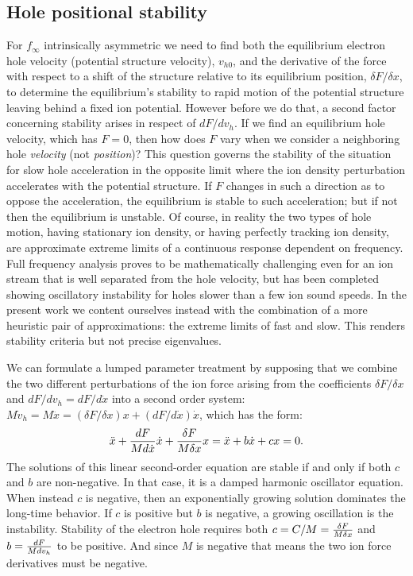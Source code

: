 \documentclass[12pt]{article}
\begin{document}
\subsection{Hole positional stability}
\label{3.2}

For $f_\infty$ intrinsically asymmetric we need to find both the
equilibrium electron hole velocity (potential structure velocity),
$v_{h0}$, and the derivative of the force with respect to a shift of
the structure relative to its equilibrium position,
$\delta F/\delta x$, to determine the equilibrium's stability to rapid
motion of the potential structure leaving behind a fixed ion
potential. However before we do that, a second factor concerning
stability arises in respect of $dF/dv_h$. If we find an equilibrium
hole velocity, which has $F=0$, then how does $F$ vary when we
consider a neighboring hole \emph{velocity} (not \emph{position})?
This question governs the stability of the situation for slow hole
acceleration in the opposite limit where the ion density perturbation
accelerates with the potential structure. If $F$ changes in such a
direction as to oppose the acceleration, the equilibrium is stable to
such acceleration; but if not then the equilibrium is unstable. Of
course, in reality the two types of hole motion, having stationary ion
density, or having perfectly tracking ion density, are approximate
extreme limits of a continuous response dependent on frequency. Full
frequency analysis proves to be mathematically challenging even for an
ion stream that is well separated from the hole velocity, but has been
completed showing oscillatory instability for holes slower than a few
ion sound speeds\cite{Zhou2017}.  In the present work we content
ourselves instead with the combination of a more heuristic pair of
approximations: the extreme limits of fast and slow. This renders
stability criteria but not precise eigenvalues.


We can formulate a lumped parameter treatment by supposing that we
combine the two different perturbations of the ion force arising from
the coefficients $\delta F/\delta x$ and $dF/dv_h=dF/d\dot x$ into a
second order system:
$M\dot v_h= M\ddot x = (\delta F/\delta x) x + (dF/d\dot x) \dot x$,
which has the form:
\begin{equation}
  \label{eq:harmosc}
  \ddot x +{dF\over Md\dot x}\dot x+{\delta F\over M\delta x} x= \ddot x+
   b\dot x + c x=0.
\end{equation}
The solutions of this linear second-order equation are stable if and
only if both $c$ and $b$ are non-negative. In that case, it is a damped
harmonic oscillator equation. When instead $c$ is negative, then an
exponentially growing solution dominates the long-time behavior. If
$c$ is positive but $b$ is negative, a growing oscillation is the
instability. Stability of the electron hole requires both $c=C/M={\delta
  F\over M\delta x}$ and $b={dF\over Md v_h}$ to be positive. And
since $M$ is negative that means the two ion force derivatives must be
negative. 
\end{document}
